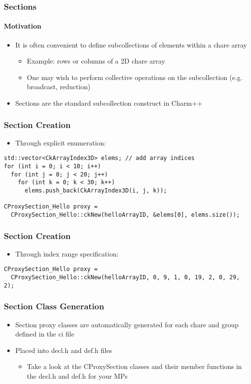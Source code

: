 \begin{frame}[fragile]
\frametitle{Sections}
\framesubtitle{Motivation}
\begin{itemize}
 \item It is often convenient to define subcollections of elements within a
   chare array
   \begin{itemize}
   \item Example: rows or columns of a 2D chare array
   \item One may wish to perform collective operations on the subcollection
     (e.g. broadcast, reduction)
   \end{itemize}
 \item Sections are the standard subcollection construct in Charm++
\end{itemize}
\end{frame}

\begin{frame}[fragile]
\frametitle{Section Creation}
\begin{itemize}
 \item Through explicit enumeration:
\end{itemize}

\begin{lstlisting}
std::vector<CkArrayIndex3D> elems; // add array indices
for (int i = 0; i < 10; i++)
  for (int j = 0; j < 20; j++)
    for (int k = 0; k < 30; k++)
      elems.push_back(CkArrayIndex3D(i, j, k));

CProxySection_Hello proxy =
  CProxySection_Hello::ckNew(helloArrayID, &elems[0], elems.size());
\end{lstlisting}
\end{frame}

\begin{frame}[fragile]
\frametitle{Section Creation}
\begin{itemize}
 \item Through index range specification:
\end{itemize}

\begin{lstlisting}
CProxySection_Hello proxy =
  CProxySection_Hello::ckNew(helloArrayID, 0, 9, 1, 0, 19, 2, 0, 29, 2);
\end{lstlisting}
\end{frame}

\begin{frame}[fragile]
\frametitle{Section Class Generation}
\begin{itemize}
 \item Section proxy classes are automatically generated for each chare and group defined in the ci file
 \item Placed into decl.h and def.h files
   \begin{itemize}
   \item Take a look at the CProxySection classes and their member functions in
     the decl.h and def.h for your MPs
   \end{itemize}
\end{itemize}
\end{frame}

